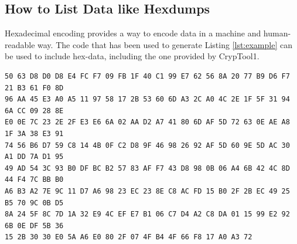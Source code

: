 \documentclass[]{scrartcl}
\newcommand{\ctone}{CrypTool1}
\begin{document}
\subsection{How to List Data like Hexdumps}

Hexadecimal encoding provides a way to encode data in a machine and human-readable way. The code that has been used to generate Listing \ref{lst:example} can be used to include hex-data, including the one provided by \ctone{}. 
\begin{lstlisting}[style=plusStyle, caption={Example for how to include hex-data.},basicstyle=\tiny\ttfamily,label=lst:example]
50 63 D8 D0 D8 E4 FC F7 09 FB 1F 40 C1 99 E7 62 56 8A 20 77 B9 D6 F7 21 B3 61 F0 8D
96 AA 45 E3 A0 A5 11 97 58 17 2B 53 60 6D A3 2C A0 4C 2E 1F 5F 31 94 6A CC 09 28 8E
E0 0E 7C 23 2E 2F E3 E6 6A 02 AA D2 A7 41 80 6D AF 5D 72 63 0E AE A8 1F 3A 38 E3 91
74 56 B6 D7 59 C8 14 4B 0F C2 D8 9F 46 98 26 92 AF 5D 60 9E 5D AC 30 A1 DD 7A D1 95
49 AD 54 3C 93 B0 DF BC B2 57 83 AF F7 43 D8 98 0B 06 A4 6B 42 4C 8D 44 F4 7C BB B0
A6 B3 A2 7E 9C 11 D7 A6 98 23 EC 23 8E C8 AC FD 15 B0 2F 2B EC 49 25 B5 70 9C 0B D5
8A 24 5F 8C 7D 1A 32 E9 4C EF E7 B1 06 C7 D4 A2 C8 DA 01 15 99 E2 92 6B 0E DF 5B 36
15 2B 30 30 E0 5A A6 E0 80 2F 07 4F B4 4F 66 F8 17 A0 A3 72
\end{lstlisting}
\end{document}
